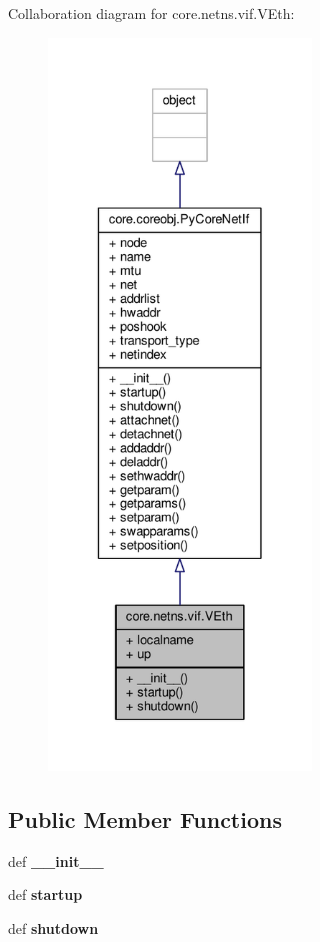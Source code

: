 Collaboration diagram for core.\+netns.\+vif.\+V\+Eth\+:
\nopagebreak
\begin{figure}[H]
\begin{center}
\leavevmode
\includegraphics[height=550pt]{classcore_1_1netns_1_1vif_1_1_v_eth__coll__graph}
\end{center}
\end{figure}
\subsection*{Public Member Functions}
\begin{DoxyCompactItemize}
\item 
\hypertarget{classcore_1_1netns_1_1vif_1_1_v_eth_a49d977c45cc6074bfb458fd3f3a484c6}{def {\bfseries \+\_\+\+\_\+init\+\_\+\+\_\+}}\label{classcore_1_1netns_1_1vif_1_1_v_eth_a49d977c45cc6074bfb458fd3f3a484c6}

\item 
\hypertarget{classcore_1_1netns_1_1vif_1_1_v_eth_adc2901f786405726d154248c431b2c65}{def {\bfseries startup}}\label{classcore_1_1netns_1_1vif_1_1_v_eth_adc2901f786405726d154248c431b2c65}

\item 
\hypertarget{classcore_1_1netns_1_1vif_1_1_v_eth_a3b624d29c1c88b22b55c5c832278ac76}{def {\bfseries shutdown}}\label{classcore_1_1netns_1_1vif_1_1_v_eth_a3b624d29c1c88b22b55c5c832278ac76}

\end{DoxyCompactItemize}
